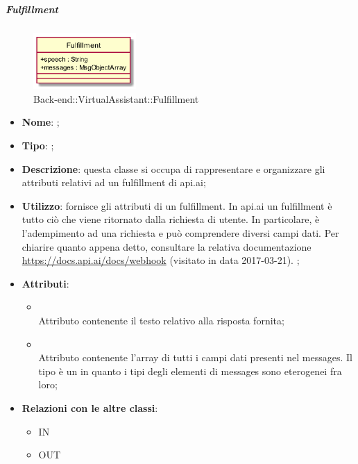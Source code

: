 \hypertarget{Fulfillment_label}{\subparagraph{Fulfillment}}
\begin{figure}[h]
	\centering
	\includegraphics[width=0.35\textwidth,height=\textheight,keepaspectratio]{images/ClassFulfillment.png}
	\caption{Back-end::VirtualAssistant::Fulfillment}
\end{figure}
\begin{itemize}
	\item \textbf{Nome}: ;
	\item \textbf{Tipo}: ;
	\item \textbf{Descrizione}: questa classe si occupa di rappresentare e organizzare gli attributi relativi ad un fulfillment di api.ai;
	\item \textbf{Utilizzo}: fornisce gli attributi di un fulfillment.
	In api.ai un fulfillment è tutto ciò che viene ritornato dalla richiesta di utente. In particolare, è l'adempimento ad una richiesta e può comprendere diversi campi dati.
	Per chiarire quanto appena detto, consultare la relativa documentazione \url{https://docs.api.ai/docs/webhook}  (visitato in data 2017-03-21).
	;
	\item \textbf{Attributi}:
	\begin{itemize}
		\item[]  \\
		Attributo contenente il testo relativo alla risposta fornita;
		\item[]  \\
		Attributo contenente l'array di tutti i campi dati presenti nel messages.
		Il tipo è un  in quanto i tipi degli elementi di messages sono eterogenei fra loro;
	\end{itemize}
	\item \textbf{Relazioni con le altre classi}:
	\begin{itemize}
		\item IN \hyperlink{ProcessingResult_label}{}
		\item OUT \hyperlink{MsgObject_label}{}
	\end{itemize}
\end{itemize}
\FloatBarrier

